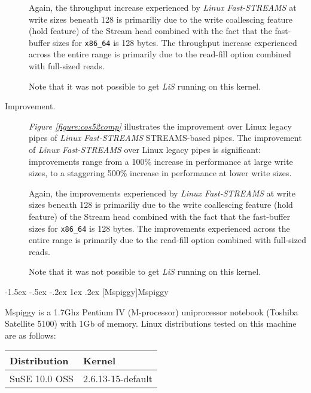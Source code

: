 \documentclass[letterpaper,final,notitlepage,twocolumn,10pt,twoside]{article}
\makeatletter
\renewcommand\subsection{\@startsection{subsection}{2}{\z@}%
                                     {-1.5ex \@plus -.5ex \@minus -.2ex}%
                                     {1ex \@plus .2ex}%
                                     {\normalfont\normalsize\bfseries}}
\makeatother
\begin{document}
\begin{description}
Again, the throughput increase experienced by \textsl{Linux Fast-STREAMS} at write sizes beneath 128 is
primariliy due to the write coallescing feature (hold feature) of the Stream head combined with the
fact that the fast-buffer sizes for \texttt{x86\_64} is 128 bytes.
The throughput increase experienced across the entire range is primarily due to the read-fill option
combined with full-sized reads.

Note that it was not possible to get \textsl{LiS} running on this kernel.

\item[Improvement.]

\textit{Figure \ref{figure:cos52comp}}
illustrates the improvement over Linux legacy pipes of \textsl{Linux Fast-STREAMS} STREAMS-based
pipes.  The improvement of \textsl{Linux Fast-STREAMS} over Linux legacy pipes is significant:
improvements range from a 100\% increase in performance at large write sizes, to a staggering 500\%
increase in performance at lower write sizes.

Again, the improvements experienced by \textsl{Linux Fast-STREAMS} at write sizes beneath 128 is
primariliy due to the write coallescing feature (hold feature) of the Stream head combined with the
fact that the fast-buffer sizes for \texttt{x86\_64} is 128 bytes.
The improvements experienced across the entire range is primarily due to the read-fill option
combined with full-sized reads.

Note that it was not possible to get \textsl{LiS} running on this kernel.

\end{description}

\subsection[Mspiggy]{Mspiggy}

Mspiggy is a 1.7Ghz Pentium IV (M-processor) uniprocessor notebook (Toshiba Satellite 5100) with 1Gb
of memory.  Linux distributions tested on this machine are as follows:

\small
\setlength{\tabcolsep}{0.4em}
\setlength{\arraycolsep}{0.4em}
\begin{tabular}{ll}\\
Distribution & Kernel\\
\hline
SuSE 10.0 OSS & 2.6.13-15-default\\
\end{tabular}\\[1.0ex]
\normalsize
\end{document}

